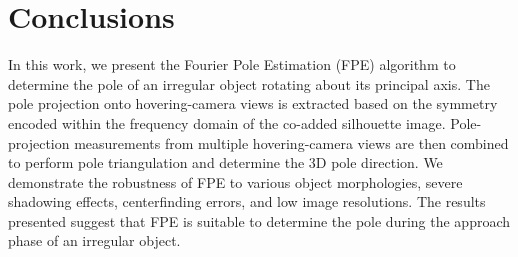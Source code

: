 
\section{Conclusions}

In this work, we present the Fourier Pole Estimation (FPE) algorithm to determine the pole of an irregular object rotating about its principal axis. The pole projection onto hovering-camera views is extracted based on the symmetry encoded within the frequency domain of the co-added silhouette image. Pole-projection measurements from multiple hovering-camera views are then combined to perform pole triangulation and determine the 3D pole direction. We demonstrate the robustness of FPE to various object morphologies, severe shadowing effects, centerfinding errors, and low image resolutions. The results presented suggest that FPE is suitable to determine the pole during the approach phase of an irregular object.

%
